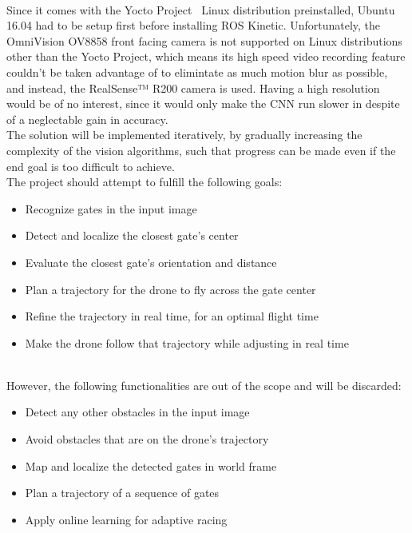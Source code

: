 ~\\Since it comes with the Yocto Project~\cite{Yocto} Linux distribution preinstalled, Ubuntu
16.04 had to be setup first before installing ROS Kinetic. Unfortunately, the
OmniVision OV8858 front facing camera is not supported on Linux distributions
other than the Yocto Project, which means its high speed video recording feature
couldn't be taken advantage of to elimintate as much motion blur as possible,
and instead, the RealSense™ R200 camera is used. Having a high resolution would
be of no interest, since it would only make the CNN run slower in despite of a
neglectable gain in accuracy.\\


The solution will be implemented iteratively, by gradually increasing the
complexity of the vision algorithms, such that progress can be made even if the
end goal is too difficult to achieve.\\

The project should attempt to fulfill the following goals:

\begin{itemize}
	\item{Recognize gates in the input image}
	\item{Detect and localize the closest gate's center}
	\item{Evaluate the closest gate's orientation and distance}
	\item{Plan a trajectory for the drone to fly across the gate center}
	\item{Refine the trajectory in real time, for an optimal flight time}
	\item{Make the drone follow that trajectory while adjusting in real time}
\end{itemize}
~\\
However, the following functionalities are out of the scope and will be
discarded:

\begin{itemize}
	\item{Detect any other obstacles in the input image}
	\item{Avoid obstacles that are on the drone's trajectory}
	\item{Map and localize the detected gates in world frame}
	\item{Plan a trajectory of a sequence of gates}
	\item{Apply online learning for adaptive racing}
\end{itemize}
